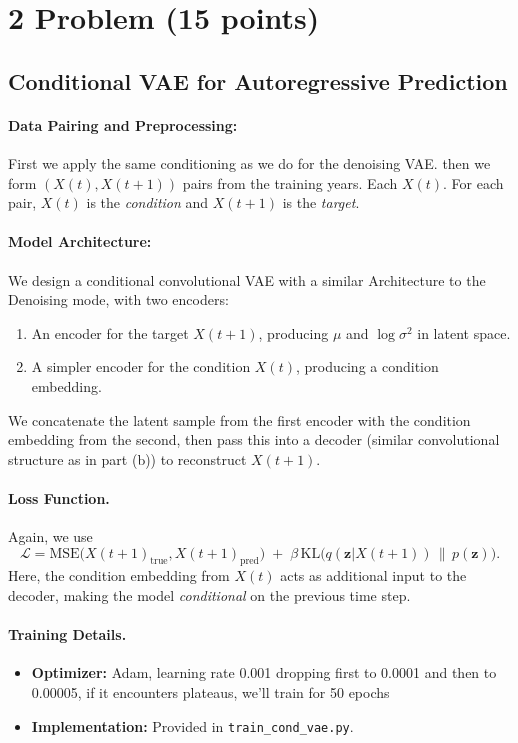\documentclass{article}
\begin{document}
\FloatBarrier
\newpage
\section*{2 Problem (15 points)}

\subsection*{Conditional VAE for Autoregressive Prediction}

\paragraph{Data Pairing and Preprocessing:}
First we apply the same conditioning as we do for the denoising VAE.
then we form \((X(t), X(t+1))\) pairs from the training years. Each \(X(t)\). For each pair, \(X(t)\) is the \textit{condition} and \(X(t+1)\) is the \textit{target}.

\paragraph{Model Architecture:}
We design a conditional convolutional VAE with a similar Architecture to the Denoising mode, with two encoders:
\begin{enumerate}
    \item An encoder for the target \(X(t+1)\), producing \(\mu\) and \(\log\sigma^2\) in latent space.
    \item A simpler encoder for the condition \(X(t)\), producing a condition embedding.
\end{enumerate}
We concatenate the latent sample from the first encoder with the condition embedding from the second, then pass this into a decoder (similar convolutional structure as in part (b)) to reconstruct \(X(t+1)\).

\paragraph{Loss Function.}
Again, we use
\[
\mathcal{L} = \mathrm{MSE}\bigl(X(t+1)_{\text{true}}, X(t+1)_{\text{pred}}\bigr) \;+\; \beta \,\mathrm{KL}\bigl(q(\mathbf{z} | X(t+1)) \,\|\, p(\mathbf{z})\bigr).
\]
Here, the condition embedding from \(X(t)\) acts as additional input to the decoder, making the model \emph{conditional} on the previous time step.

\paragraph{Training Details.}
\begin{itemize}
    \item \textbf{Optimizer:} Adam, learning rate 0.001 dropping first to 0.0001 and then to 0.00005, if it encounters plateaus, we'll train for 50 epochs
    \item \textbf{Implementation:} Provided in \texttt{train\_cond\_vae.py}.
\end{itemize}
\end{document}
